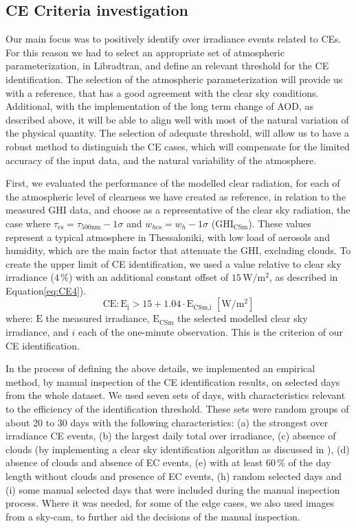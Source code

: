 \documentclass[preprint, 5p,
authoryear]{elsarticle} %
\begin{document}
\hypertarget{ce-criteria-investigation}{%
\subsection{CE Criteria investigation}\label{ce-criteria-investigation}}

Our main focus was to positively identify over irradiance events related
to CEs. For this reason we had to select an appropriate set of
atmospheric parameterization, in Libradtran, and define an relevant
threshold for the CE identification. The selection of the atmospheric
parameterization will provide us with a reference, that has a good
agreement with the clear sky conditions. Additional, with the
implementation of the long term change of AOD, as described above, it
will be able to align well with most of the natural variation of the
physical quantity. The selection of adequate threshold, will allow us to
have a robust method to distinguish the CE cases, which will compensate
for the limited accuracy of the input data, and the natural variability
of the atmosphere.

First, we evaluated the performance of the modelled clear radiation, for
each of the atmospheric level of clearness we have created as reference,
in relation to the measured GHI data, and choose as a representative of
the clear sky radiation, the case where
\(\tau_{\text{cs}} = \tau_{500\text{nm}} - 1\sigma\) and
\(w_{h\text{cs}} = w_h - 1\sigma\) (\(\text{GHI}_\text{CSm}\)). These
values represent a typical atmosphere in Thessaloniki, with low load of
aerosols and humidity, which are the main factor that attenuate the GHI,
excluding clouds. To create the upper limit of CE identification, we
used a value relative to clear sky irradiance (\(4\,\%\)) with an
additional constant offset of \(15\,\text{W}/\text{m}^2\), as described
in Equation\nobreakspace\ref{eq:CE4}). \begin{equation}
\text{CE} : \text{E}_\text{i} > 15 + 1.04 \cdot \text{E}_\text{CSm,i} \,\,[\text{W}/\text{m}^2] \label{eq:CE4}
\end{equation} where: \(\text{E}\) the measured irradiance,
\(\text{E}_\text{CSm}\) the selected modelled clear sky irradiance, and
\(i\) each of the one-minute observation. This is the criterion of our
CE identification.

In the process of defining the above details, we implemented an
empirical method, by manual inspection of the CE identification results,
on selected days from the whole dataset. We used seven sets of days,
with characteristics relevant to the efficiency of the identification
threshold. These sets were random groups of about 20 to 30 days with the
following characteristics: (a) the strongest over irradiance CE events,
(b) the largest daily total over irradiance, (c) absence of clouds (by
implementing a clear sky identification algorithm as discussed in
\citet{Natsis2023}), (d) absence of clouds and absence of EC events, (e)
with at least \(60\,\%\) of the day length without clouds and presence
of EC events, (h) random selected days and (i) some manual selected days
that were included during the manual inspection process. Where it was
needed, for some of the edge cases, we also used images from a sky-cam,
to further aid the decisions of the manual inspection.
\end{document}
